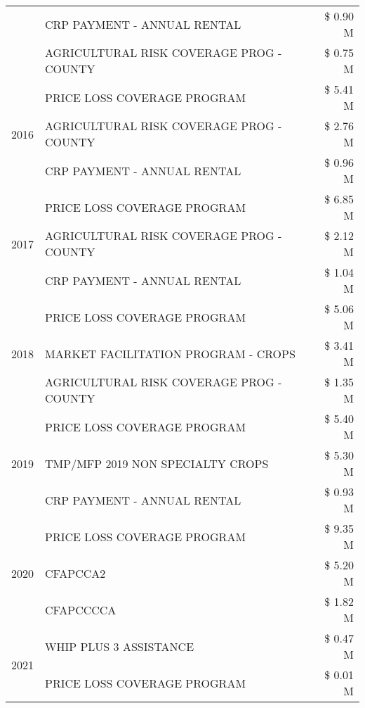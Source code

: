 \begin{tabular}{llr}
 & CRP PAYMENT - ANNUAL RENTAL & \$ 0.90 M \\
 & AGRICULTURAL RISK COVERAGE PROG - COUNTY & \$ 0.75 M \\
\cline{1-3}
\multirow[t]{3}{*}{2016} & PRICE LOSS COVERAGE PROGRAM & \$ 5.41 M \\
 & AGRICULTURAL RISK COVERAGE PROG - COUNTY & \$ 2.76 M \\
 & CRP PAYMENT - ANNUAL RENTAL & \$ 0.96 M \\
\cline{1-3}
\multirow[t]{3}{*}{2017} & PRICE LOSS COVERAGE PROGRAM & \$ 6.85 M \\
 & AGRICULTURAL RISK COVERAGE PROG - COUNTY & \$ 2.12 M \\
 & CRP PAYMENT - ANNUAL RENTAL & \$ 1.04 M \\
\cline{1-3}
\multirow[t]{3}{*}{2018} & PRICE LOSS COVERAGE PROGRAM & \$ 5.06 M \\
 & MARKET FACILITATION PROGRAM - CROPS & \$ 3.41 M \\
 & AGRICULTURAL RISK COVERAGE PROG - COUNTY & \$ 1.35 M \\
\cline{1-3}
\multirow[t]{3}{*}{2019} & PRICE LOSS COVERAGE PROGRAM & \$ 5.40 M \\
 & TMP/MFP 2019 NON SPECIALTY CROPS & \$ 5.30 M \\
 & CRP PAYMENT - ANNUAL RENTAL & \$ 0.93 M \\
\cline{1-3}
\multirow[t]{3}{*}{2020} & PRICE LOSS COVERAGE PROGRAM & \$ 9.35 M \\
 & CFAPCCA2 & \$ 5.20 M \\
 & CFAPCCCCA & \$ 1.82 M \\
\cline{1-3}
\multirow[t]{2}{*}{2021} & WHIP PLUS 3 ASSISTANCE & \$ 0.47 M \\
 & PRICE LOSS COVERAGE PROGRAM & \$ 0.01 M \\
\cline{1-3}
\bottomrule
\end{tabular}

